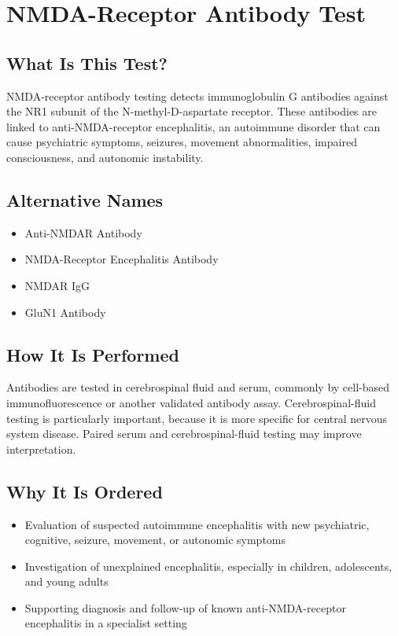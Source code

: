 \chapter{NMDA-Receptor Antibody Test}

\section*{What Is This Test?}
NMDA-receptor antibody testing detects immunoglobulin G antibodies against the NR1 subunit of the N-methyl-D-aspartate receptor. These antibodies are linked to anti-NMDA-receptor encephalitis, an autoimmune disorder that can cause psychiatric symptoms, seizures, movement abnormalities, impaired consciousness, and autonomic instability.

\section*{Alternative Names}
\begin{itemize}
  \item Anti-NMDAR Antibody
  \item NMDA-Receptor Encephalitis Antibody
  \item NMDAR IgG
  \item GluN1 Antibody
\end{itemize}
\section*{How It Is Performed}
Antibodies are tested in cerebrospinal fluid and serum, commonly by cell-based immunofluorescence or another validated antibody assay. Cerebrospinal-fluid testing is particularly important, because it is more specific for central nervous system disease. Paired serum and cerebrospinal-fluid testing may improve interpretation.

\section*{Why It Is Ordered}
\begin{itemize}
  \item Evaluation of suspected autoimmune encephalitis with new psychiatric, cognitive, seizure, movement, or autonomic symptoms
  \item Investigation of unexplained encephalitis, especially in children, adolescents, and young adults
  \item Supporting diagnosis and follow-up of known anti-NMDA-receptor encephalitis in a specialist setting
\end{itemize}

